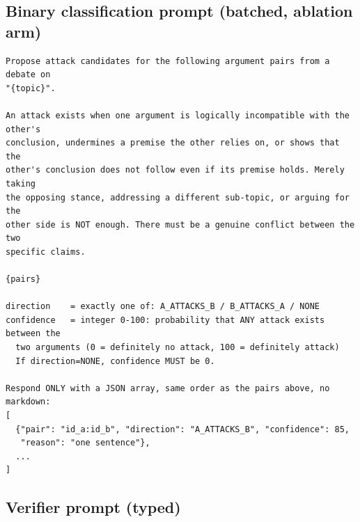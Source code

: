 \subsection*{Binary classification prompt (batched, ablation arm)}

\begin{lstlisting}[breaklines=true, basicstyle=\ttfamily\footnotesize]
Propose attack candidates for the following argument pairs from a debate on
"{topic}".

An attack exists when one argument is logically incompatible with the other's
conclusion, undermines a premise the other relies on, or shows that the
other's conclusion does not follow even if its premise holds. Merely taking
the opposing stance, addressing a different sub-topic, or arguing for the
other side is NOT enough. There must be a genuine conflict between the two
specific claims.

{pairs}

direction    = exactly one of: A_ATTACKS_B / B_ATTACKS_A / NONE
confidence   = integer 0-100: probability that ANY attack exists between the
  two arguments (0 = definitely no attack, 100 = definitely attack)
  If direction=NONE, confidence MUST be 0.

Respond ONLY with a JSON array, same order as the pairs above, no markdown:
[
  {"pair": "id_a:id_b", "direction": "A_ATTACKS_B", "confidence": 85,
   "reason": "one sentence"},
  ...
]
\end{lstlisting}

\subsection*{Verifier prompt (typed)}

